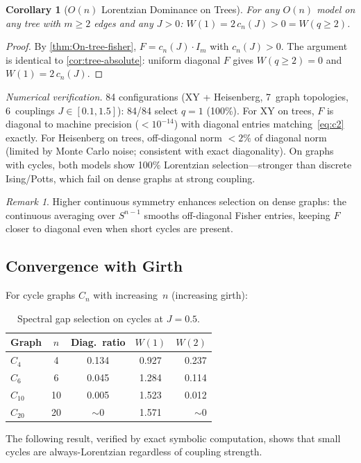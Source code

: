 \documentclass[11pt]{article}
\newtheorem{corollary}[theorem]{Corollary}
\theoremstyle{definition}
\theoremstyle{remark}
\newtheorem{remark}[theorem]{Remark}
\begin{document}
\begin{corollary}[$O(n)$ Lorentzian Dominance on Trees]
\label{cor:On-lorentzian}
For any $O(n)$ model on any tree with $m \geq 2$ edges and any $J > 0$:
$W(1) = 2\,c_n(J) > 0 = W(q \geq 2)$.
\end{corollary}

\begin{proof}
By \cref{thm:On-tree-fisher}, $F = c_n(J) \cdot I_m$ with $c_n(J) > 0$.
The argument is identical to \cref{cor:tree-absolute}: uniform diagonal
$F$ gives $W(q \geq 2) = 0$ and $W(1) = 2\,c_n(J)$.
\end{proof}

\noindent\emph{Numerical verification.}
84 configurations (XY + Heisenberg, 7~graph topologies,
6~couplings $J \in [0.1, 1.5]$): 84/84 select $q = 1$ (100\%).
For XY on trees, $F$ is diagonal to machine precision ($< 10^{-14}$)
with diagonal entries matching~\eqref{eq:c2} exactly.
For Heisenberg on trees, off-diagonal norm $< 2\%$ of diagonal norm
(limited by Monte Carlo noise; consistent with exact diagonality).
On graphs with cycles, both models show 100\% Lorentzian selection---stronger
than discrete Ising/Potts, which fail on dense graphs at strong coupling.

\begin{remark}
Higher continuous symmetry enhances selection on dense graphs:
the continuous averaging over $S^{n-1}$ smooths off-diagonal Fisher entries,
keeping $F$ closer to diagonal even when short cycles are present.
\end{remark}

\subsection{Convergence with Girth}

For cycle graphs $C_n$ with increasing~$n$ (increasing girth):
\begin{table}[htbp]
\centering
\caption{Spectral gap selection on cycles at $J = 0.5$.}
\label{tab:cycles}
\begin{tabular}{@{}lcccr@{}}
\toprule
Graph & $n$ & Diag.\ ratio & $W(1)$ & $W(2)$ \\
\midrule
$C_4$ & 4 & 0.134 & 0.927 & 0.237 \\
$C_6$ & 6 & 0.045 & 1.284 & 0.114 \\
$C_{10}$ & 10 & 0.005 & 1.523 & 0.012 \\
$C_{20}$ & 20 & ${\sim}0$ & 1.571 & ${\sim}0$ \\
\bottomrule
\end{tabular}
\end{table}
The following result, verified by exact symbolic computation, shows that
small cycles are always-Lorentzian regardless of coupling strength.
\end{document}
